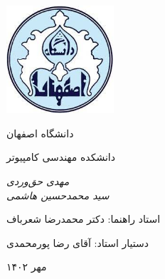 \documentclass[11pt, oneside]{book}
\begin{document}
\begin{titlepage}
    \centering
    \includegraphics[width=4cm, height=4cm]{../images/logo}\par
    \vspace{2mm}            دانشگاه اصفهان \par
    دانشکده مهندسی کامپیوتر \par
    
    \vspace{1cm}
    {\huge {}\par}
    \vspace{3cm}
    {\small\itshape                مهدی حق‌وردی\\
        سید محمدحسین هاشمی \par}
    
    \vfill \par	\vfill
    
    \vfill            استاد راهنما:‌ دکتر محمدرضا شعرباف \par
    دستیار استاد:‌ آقای رضا پورمحمدی
    \vfill
    
    {\large مهر ۱۴۰۲\par}
\end{titlepage}
\end{document}
